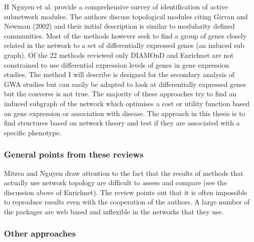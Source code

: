 H Nguyen et al. \cite{nguyen2019comprehensive} provide a comprehensive survey of identification of active subnetwork modules. The authors discuss topological modules citing Girvan and Newman (2002) \cite{girvan2002community} and their initial description is similar to modularity defined communities. Most of the methods however seek to find a group of genes closely related in the network to a set of differentially expressed genes (an induced sub graph). Of the 22 methods reviewed only DIAMOnD \cite{ghiassian2015disease} and Enrichnet \cite{glaab2012enrichnet} are not constrained to use differential expression levels of genes in gene expression studies. The method I will describe is designed for the secondary analysis of GWA studies but can easily be adapted to look at differentially expressed genes but the converse is not true. The majority of these approaches try to find an induced subgraph of the network which optimises a cost or utility function based on gene expression or association with disease. The approach in this thesis is to find structures based on network theory and test if they are associated with a specific phenotype.

\subsubsection{General points from these reviews}
Mitrea\cite{mitrea2013methods} and Nguyen \cite{nguyen2018network} draw attention to the fact that the results of methods that actually use network topology are difficult to assess and compare (see the discussion above of Enrichnet). The review points out that it is often impossible to reproduce results even with the cooperation of the authors. A large number of the packages are web based and inflexible in the networks that they use.
\subsubsection{Other approaches}



